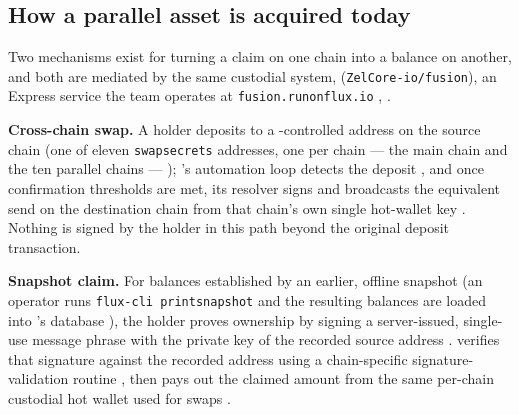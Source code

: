 \subsection{How a parallel asset is acquired today}
\label{sec:pa-acquisition}

Two mechanisms exist for turning a claim on one chain into a balance on another, and both are
mediated by the same custodial system, \Fusion (\texttt{Zel\allowbreak{}Core-\allowbreak{}io/\allowbreak{}fusion}), an Express service the
team operates at \texttt{fusion.\allowbreak{}runonflux.\allowbreak{}io}
\shipped {}, .

\textbf{Cross-chain swap.} A holder deposits to a \Fusion-controlled address on the source chain
(one of eleven \texttt{swapsecrets} addresses, one per chain --- the main chain and the ten parallel chains ---
\shipped {}); \Fusion's automation loop detects the
deposit \shipped {}, and once
confirmation thresholds are met, its resolver signs and broadcasts the equivalent send on the
destination chain from that chain's own single hot-wallet key
\shipped {}. Nothing is signed by the holder in
this path beyond the original deposit transaction.

\textbf{Snapshot claim.} For balances established by an earlier, offline snapshot (an operator runs
\texttt{flux-\allowbreak{}cli printsnapshot} and the resulting balances are loaded into \Fusion's database
), the holder proves ownership by signing a
server-issued, single-use message phrase with the private key of the recorded source address
\shipped {}. \Fusion verifies that
signature against the recorded address using a chain-specific signature-validation routine
\shipped {}, then pays out the claimed amount
from the same per-chain custodial hot wallet used for swaps
\shipped {}.

